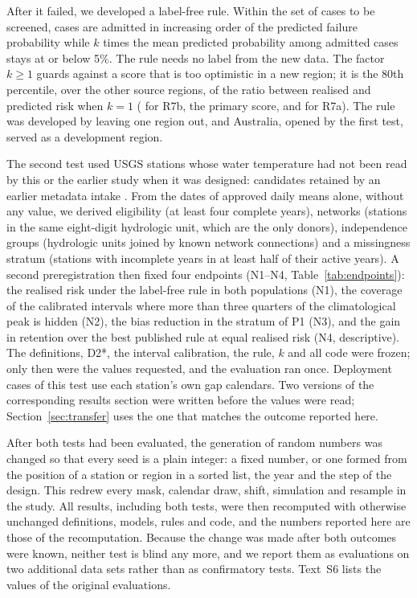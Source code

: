 \documentclass[draft]{agujournal2025}
\begin{document}
After it failed, we developed a label-free rule. Within the set of cases to be screened, cases are admitted in increasing order of the predicted failure probability while $k$ times the mean predicted probability among admitted cases stays at or below 5\%. The rule needs no label from the new data. The factor $k \geq 1$ guards against a score that is too optimistic in a new region; it is the 80th percentile, over the other source regions, of the ratio between realised and predicted risk when $k=1$ (\TErFactor{} for R7b, the primary score, and \TErFactorA{} for R7a). The rule was developed by leaving one region out, and Australia, opened by the first test, served as a development region.

The second test used USGS stations whose water temperature had not been read by this or the earlier study when it was designed: \TNewCandidates{} candidates retained by an earlier metadata intake \cite{usgsogc2026}. From the dates of approved daily means alone, without any value, we derived eligibility (at least four complete years), networks (stations in the same eight-digit hydrologic unit, which are the only donors), independence groups (hydrologic units joined by known network connections) and a missingness stratum (stations with incomplete years in at least half of their active years). A second preregistration then fixed four endpoints (N1--N4, Table~\ref{tab:endpoints}): the realised risk under the label-free rule in both populations (N1), the coverage of the calibrated intervals where more than three quarters of the climatological peak is hidden (N2), the bias reduction in the stratum of P1 (N3), and the gain in retention over the best published rule at equal realised risk (N4, descriptive). The definitions, D2*, the interval calibration, the rule, $k$ and all code were frozen; only then were the values requested, and the evaluation ran once. Deployment cases of this test use each station's own gap calendars. Two versions of the corresponding results section were written before the values were read; Section~\ref{sec:transfer} uses the one that matches the outcome reported here.

After both tests had been evaluated, the generation of random numbers was changed so that every seed is a plain integer: a fixed number, or one formed from the position of a station or region in a sorted list, the year and the step of the design. This redrew every mask, calendar draw, shift, simulation and resample in the study. All results, including both tests, were then recomputed with otherwise unchanged definitions, models, rules and code, and the numbers reported here are those of the recomputation. Because the change was made after both outcomes were known, neither test is blind any more, and we report them as evaluations on two additional data sets rather than as confirmatory tests. Text~S6 lists the values of the original evaluations.
\end{document}
